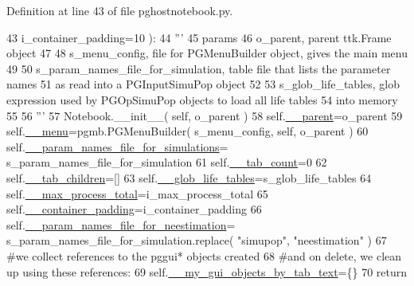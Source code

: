 Definition at line 43 of file pghostnotebook.\+py.


\begin{DoxyCode}
43                     i\_container\_padding=10 ):
44         \textcolor{stringliteral}{'''}
45 \textcolor{stringliteral}{        params }
46 \textcolor{stringliteral}{        o\_parent, parent ttk.Frame object}
47 \textcolor{stringliteral}{}
48 \textcolor{stringliteral}{        s\_menu\_config, file for PGMenuBuilder object, gives the main menu}
49 \textcolor{stringliteral}{}
50 \textcolor{stringliteral}{        s\_param\_names\_file\_for\_simulation, table file that lists the parameter names}
51 \textcolor{stringliteral}{           as read into a PGInputSimuPop object}
52 \textcolor{stringliteral}{}
53 \textcolor{stringliteral}{        s\_glob\_life\_tables, glob expression used by PGOpSimuPop objects to load all life tables}
54 \textcolor{stringliteral}{            into memory}
55 \textcolor{stringliteral}{}
56 \textcolor{stringliteral}{        '''}
57         Notebook.\_\_init\_\_( self, o\_parent )
58         self.\hyperlink{classnegui_1_1pghostnotebook_1_1PGHostNotebook_ae3a4078b5e41c208da268dfee99bb622}{\_\_parent}=o\_parent
59         self.\hyperlink{classnegui_1_1pghostnotebook_1_1PGHostNotebook_add1ab1bb7f792ff733e8236fed00218c}{\_\_menu}=pgmb.PGMenuBuilder( s\_menu\_config, self, o\_parent )
60         self.\hyperlink{classnegui_1_1pghostnotebook_1_1PGHostNotebook_a9b145ef56ff954c480d856859fcda86e}{\_\_param\_names\_file\_for\_simulations}=
      s\_param\_names\_file\_for\_simulation
61         self.\hyperlink{classnegui_1_1pghostnotebook_1_1PGHostNotebook_a84a7417cc57500cbe5c230449ba464b3}{\_\_tab\_count}=0
62         self.\hyperlink{classnegui_1_1pghostnotebook_1_1PGHostNotebook_aa3a7876014bd06be174732b7d814bfa8}{\_\_tab\_children}=[]
63         self.\hyperlink{classnegui_1_1pghostnotebook_1_1PGHostNotebook_af63d9ae9cde1ec2155d4dc81934d00c7}{\_\_glob\_life\_tables}=s\_glob\_life\_tables
64         self.\hyperlink{classnegui_1_1pghostnotebook_1_1PGHostNotebook_a14287e3e1cf5c33d9be0ff28d031fc04}{\_\_max\_process\_total}=i\_max\_process\_total
65         self.\hyperlink{classnegui_1_1pghostnotebook_1_1PGHostNotebook_a790570fc06951c4ccc142a26c01668ef}{\_\_container\_padding}=i\_container\_padding
66         self.\hyperlink{classnegui_1_1pghostnotebook_1_1PGHostNotebook_a38f70ee82a0a2852953b964623a4c871}{\_\_param\_names\_file\_for\_neestimation}=
      s\_param\_names\_file\_for\_simulation.replace( \textcolor{stringliteral}{"simupop"}, \textcolor{stringliteral}{"neestimation"} )
67         \textcolor{comment}{#we collect references to the pggui* objects created}
68         \textcolor{comment}{#and on delete, we clean up using these references:}
69         self.\hyperlink{classnegui_1_1pghostnotebook_1_1PGHostNotebook_af4966fb6fc80c08cd38bf21b2c723364}{\_\_my\_gui\_objects\_by\_tab\_text}=\{\}
70         \textcolor{keywordflow}{return}
\end{DoxyCode}


